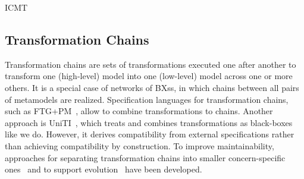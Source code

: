 \begin{copiedFrom}{ICMT}
\subsection*{Transformation Chains}
Transformation chains
are sets of transformations executed one after another to transform one (high-level) model into one (low-level) model across one or more others. %
It is a special case of networks of \acp{BX}s, in which chains between all pairs of metamodels are realized. %
Specification languages for transformation chains, such as FTG+PM~\cite{lucio2013FTGPM-SDL}, allow to combine transformations to chains.
Another approach is UniTI~\cite{vanhooff2006a, vanhooff2007UniTI-MODELS, pilgrim2008a}, 
which treats and combines transformations as black-boxes like we do. 
However, it derives compatibility from external specifications rather than achieving compatibility by construction.
To improve maintainability, approaches for separating transformation chains into smaller concern-specific ones~\cite{yie2012a} and to support evolution~\cite{yie2009a} have been developed.



\end{copiedFrom}
